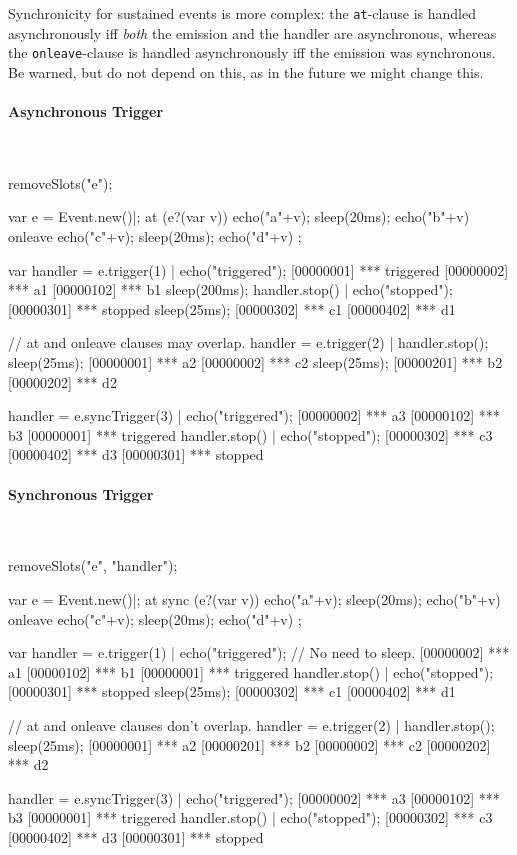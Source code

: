 Synchronicity for sustained events is more complex: the
\lstinline|at|-clause is handled asynchronously iff \emph{both} the emission
and the handler are asynchronous, whereas the \lstinline|onleave|-clause is
handled asynchronously iff the emission was synchronous.  Be warned, but do
not depend on this, as in the future we might change this.

\begin{multicols}{2}
\paragraph{Asynchronous Trigger}~

\begin{urbicomment}
removeSlots("e");
\end{urbicomment}
\begin{urbiscript}[xrightmargin=0mm,xleftmargin=0mm]
var e = Event.new()|;
at (e?(var v))
  { echo("a"+v); sleep(20ms); echo("b"+v) }
onleave
  { echo("c"+v); sleep(20ms); echo("d"+v) };

var handler = e.trigger(1) | echo("triggered");
[00000001] *** triggered
[00000002] *** a1
[00000102] *** b1
sleep(200ms);
handler.stop() | echo("stopped");
[00000301] *** stopped
sleep(25ms);
[00000302] *** c1
[00000402] *** d1

// at and onleave clauses may overlap.
handler = e.trigger(2) | handler.stop();
sleep(25ms);
[00000001] *** a2
[00000002] *** c2
sleep(25ms);
[00000201] *** b2
[00000202] *** d2

handler = e.syncTrigger(3) | echo("triggered");
[00000002] *** a3
[00000102] *** b3
[00000001] *** triggered
handler.stop() | echo("stopped");
[00000302] *** c3
[00000402] *** d3
[00000301] *** stopped
\end{urbiscript}
\columnbreak

\paragraph{Synchronous Trigger}~

\begin{urbicomment}
removeSlots("e", "handler");
\end{urbicomment}
\begin{urbiscript}[xrightmargin=0mm,xleftmargin=0mm]
var e = Event.new()|;
at sync (e?(var v))
  { echo("a"+v); sleep(20ms); echo("b"+v) }
onleave
  { echo("c"+v); sleep(20ms); echo("d"+v) };

var handler = e.trigger(1) | echo("triggered");
// No need to sleep.
[00000002] *** a1
[00000102] *** b1
[00000001] *** triggered
handler.stop() | echo("stopped");
[00000301] *** stopped
sleep(25ms);
[00000302] *** c1
[00000402] *** d1

// at and onleave clauses don't overlap.
handler = e.trigger(2) | handler.stop();
sleep(25ms);
[00000001] *** a2
[00000201] *** b2
[00000002] *** c2
[00000202] *** d2


handler = e.syncTrigger(3) | echo("triggered");
[00000002] *** a3
[00000102] *** b3
[00000001] *** triggered
handler.stop() | echo("stopped");
[00000302] *** c3
[00000402] *** d3
[00000301] *** stopped
\end{urbiscript}
\end{multicols}


